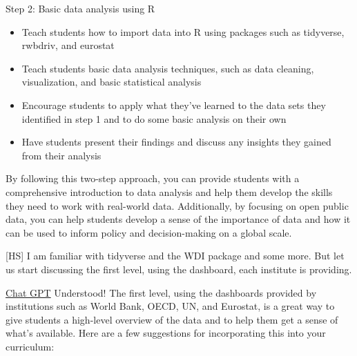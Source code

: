 \documentclass[
]{bxjsbook}
\providecommand{\tightlist}{%
  \setlength{\itemsep}{0pt}\setlength{\parskip}{0pt}}
\theoremstyle{definition}
\theoremstyle{definition}
\theoremstyle{definition}
\theoremstyle{definition}
\theoremstyle{remark}
\begin{document}
Step 2: Basic data analysis using R

\begin{itemize}
\tightlist
\item
  Teach students how to import data into R using packages such as tidyverse, rwbdriv, and eurostat
\item
  Teach students basic data analysis techniques, such as data cleaning, visualization, and basic statistical analysis
\item
  Encourage students to apply what they've learned to the data sets they identified in step 1 and to do some basic analysis on their own
\item
  Have students present their findings and discuss any insights they gained from their analysis
\end{itemize}

By following this two-step approach, you can provide students with a comprehensive introduction to data analysis and help them develop the skills they need to work with real-world data. Additionally, by focusing on open public data, you can help students develop a sense of the importance of data and how it can be used to inform policy and decision-making on a global scale.

{[}HS{]} I am familiar with tidyverse and the WDI package and some more. But let us start discussing the first level, using the dashboard, each institute is providing.

\protect\hyperlink{chatgpt}{Chat GPT} Understood! The first level, using the dashboards provided by institutions such as World Bank, OECD, UN, and Eurostat, is a great way to give students a high-level overview of the data and to help them get a sense of what's available. Here are a few suggestions for incorporating this into your curriculum:
\end{document}
